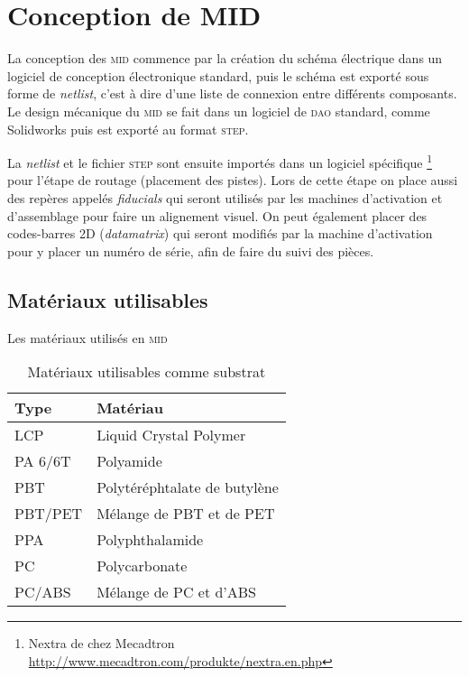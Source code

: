 
\section{Conception de MID}
La conception des \textsc{mid} commence par la création du schéma électrique
dans un logiciel de conception électronique standard, puis le schéma est exporté
sous forme de \emph{netlist}, c'est à dire d'une liste de connexion entre
différents composants. Le design mécanique du \textsc{mid} se fait dans un logiciel de
\textsc{dao} standard, comme Solidworks puis est exporté au format \textsc{step}.

La \emph{netlist} et le fichier \textsc{step} sont ensuite importés dans un
logiciel spécifique
\footnote{Nextra de chez Mecadtron
    \url{http://www.mecadtron.com/produkte/nextra.en.php}
}
pour l'étape de routage
(placement des pistes). Lors de cette étape on place aussi des repères
appelés \emph{fiducials} qui seront utilisés par les machines d'activation et
d'assemblage pour faire un alignement visuel. On peut également placer des codes-barres 2D
(\emph{datamatrix}) qui seront modifiés par la machine d'activation pour
y placer un numéro de série, afin de faire du suivi des pièces.

\subsection{Matériaux utilisables}
Les matériaux utilisés en \textsc{mid} %

\begin{table}[h]
\centering
\begin{tabular}{l l}
\toprule 
Type & Matériau \\
\midrule %
LCP & Liquid Crystal Polymer \\
PA 6/6T & Polyamide \\
PBT & Polytéréphtalate de butylène \\
PBT/PET & Mélange de PBT et de PET \\
PPA & Polyphthalamide \\
PC & Polycarbonate \\
PC/ABS & Mélange de PC et d'ABS \\ 
\bottomrule 
\end{tabular}
\caption{Matériaux utilisables comme substrat}
\label{tab:mid-materials}
\end{table}
